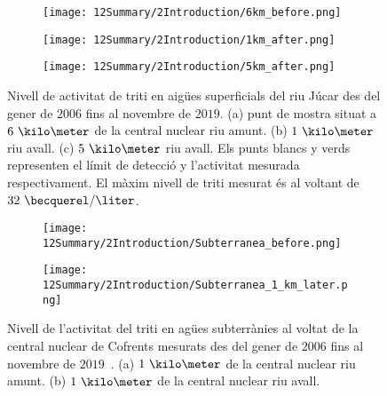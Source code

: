 \begin{figure}
\centering
    \begin{subfigure}[b]{0.7\textwidth}
    \centering
    \texttt{[image: 12Summary/2Introduction/6km\_before.png]}  
    \caption{\label{subfig:TritiL6kB}}
    \end{subfigure}
    \hfill
    \begin{subfigure}[b]{0.7\textwidth}
    \centering
    \texttt{[image: 12Summary/2Introduction/1km\_after.png]}  
    \caption{\label{subfig:TritiL1kA}}
    \end{subfigure}
    \hfill
    \begin{subfigure}[b]{0.7\textwidth}
    \centering
    \texttt{[image: 12Summary/2Introduction/5km\_after.png]}  
    \caption{\label{subfig:TritiL5kA}}
    \end{subfigure}
 \caption{Nivell de activitat de triti en aigües superficials del riu Júcar des del gener de $2006$ fins al novembre de $2019$. (a) punt de mostra situat a $6~\kilo\meter$ de la central nuclear riu amunt. (b) $1~\kilo\meter$ riu avall. (c) $5~\kilo\meter$ riu avall. Els punts blancs y verds representen el límit de detecció y l'activitat mesurada respectivament. El màxim nivell de triti mesurat és al voltant de $32~\becquerel/\liter$.~\cite{REM}}
 \label{fig:MesuresSuperficialsCofrents}
\end{figure}

\begin{figure}
\centering
    \begin{subfigure}[b]{0.7\textwidth}
    \centering
    \texttt{[image: 12Summary/2Introduction/Subterranea\_before.png]}  
    \caption{\label{subfig:TritiLG1kB}}
    \end{subfigure}
    \hfill
    \begin{subfigure}[b]{0.7\textwidth}
    \centering
    \texttt{[image: 12Summary/2Introduction/Subterranea\_1\_km\_later.png]}  
    \caption{\label{subfig:TritiLG1kA}}
    \end{subfigure}
 \caption{Nivell de l'activitat del triti en agües subterrànies al voltat de la central nuclear de Cofrents mesurats des del gener de $2006$ fins al novembre de $2019$~\cite{REM}. (a) $1~\kilo\meter$ de la central nuclear riu amunt. (b) $1~\kilo\meter$ de la central nuclear riu avall.~\cite{REM}}
 \label{fig:MesuresSuperterraniesCofrents}
\end{figure}

